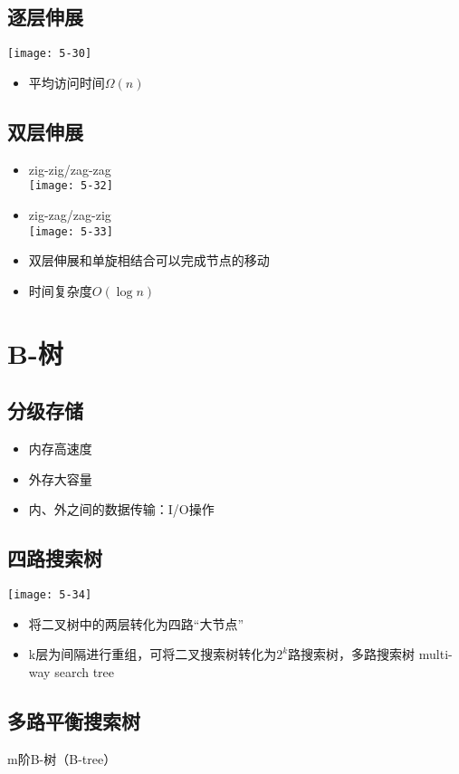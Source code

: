 \subsection{逐层伸展}
\texttt{[image: 5-30]}
\begin{itemize}
\item 平均访问时间$\Omega\left(n\right)$
\end{itemize}

\subsection{双层伸展}
\begin{itemize}
\item zig-zig/zag-zag\\
\texttt{[image: 5-32]}
\item zig-zag/zag-zig\\
\texttt{[image: 5-33]}
\item 双层伸展和单旋相结合可以完成节点的移动
\item 时间复杂度$O(\log n)$
\end{itemize}

\section{B-树}
\subsection{分级存储}
\begin{itemize}
\item 内存高速度
\item 外存大容量
\item 内、外之间的数据传输：I/O操作
\end{itemize}

\subsection{四路搜索树}
\texttt{[image: 5-34]}
\begin{itemize}
\item 将二叉树中的两层转化为四路``大节点''
\item k层为间隔进行重组，可将二叉搜索树转化为$2^k$路搜索树，多路搜索树 multi-way search tree
\end{itemize}

\subsection{多路平衡搜索树}
m阶B-树（B-tree）

